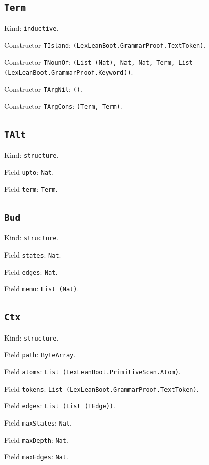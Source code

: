 \documentclass[11pt]{article}
\begin{document}
\subsection*{\texttt{Term}}
\noindent Kind: \texttt{inductive}.\par
\noindent Constructor \texttt{TIsland}: \texttt{(LexLeanBoot.GrammarProof.TextToken)}.\par
\noindent Constructor \texttt{TNounOf}: \texttt{(List (Nat), Nat, Nat, Term, List (LexLeanBoot.GrammarProof.Keyword))}.\par
\noindent Constructor \texttt{TArgNil}: \texttt{()}.\par
\noindent Constructor \texttt{TArgCons}: \texttt{(Term, Term)}.\par
\subsection*{\texttt{TAlt}}
\noindent Kind: \texttt{structure}.\par
\noindent Field \texttt{upto}: \texttt{Nat}.\par
\noindent Field \texttt{term}: \texttt{Term}.\par
\subsection*{\texttt{Bud}}
\noindent Kind: \texttt{structure}.\par
\noindent Field \texttt{states}: \texttt{Nat}.\par
\noindent Field \texttt{edges}: \texttt{Nat}.\par
\noindent Field \texttt{memo}: \texttt{List (Nat)}.\par
\subsection*{\texttt{Ctx}}
\noindent Kind: \texttt{structure}.\par
\noindent Field \texttt{path}: \texttt{ByteArray}.\par
\noindent Field \texttt{atoms}: \texttt{List (LexLeanBoot.PrimitiveScan.Atom)}.\par
\noindent Field \texttt{tokens}: \texttt{List (LexLeanBoot.GrammarProof.TextToken)}.\par
\noindent Field \texttt{edges}: \texttt{List (List (TEdge))}.\par
\noindent Field \texttt{maxStates}: \texttt{Nat}.\par
\noindent Field \texttt{maxDepth}: \texttt{Nat}.\par
\noindent Field \texttt{maxEdges}: \texttt{Nat}.\par
\end{document}
